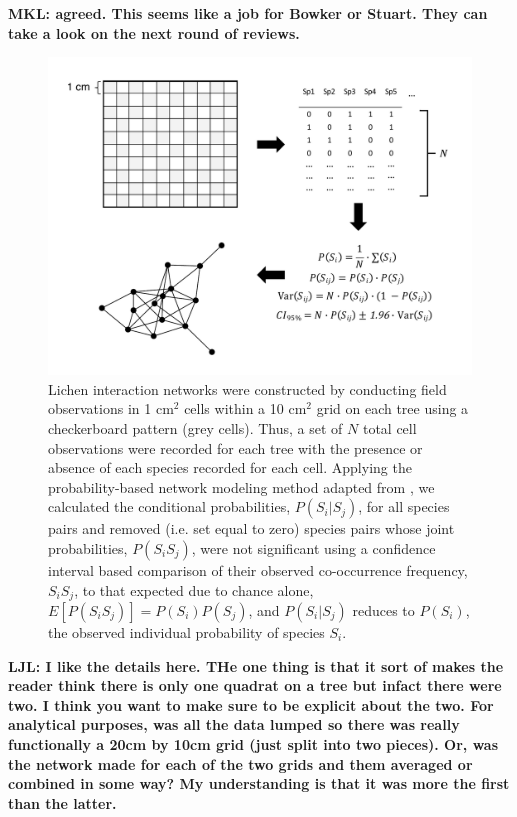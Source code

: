 \documentclass[9pt,twocolumn,twoside,lineno]{pnas-new}
\begin{document}
{\textbf{MKL: agreed. This seems like a job for Bowker or Stuart. They
  can take a look on the next round of reviews.}

\begin{figure}[ht]
\centering
\includegraphics[width=\linewidth]{lcn_araujo_method.pdf}
\caption{Lichen interaction networks were constructed by conducting
  field observations in 1 cm$^2$ cells within a 10 cm$^2$ grid on each
  tree using a checkerboard pattern (grey cells). Thus, a set of $N$
  total cell observations were recorded for each tree with the
  presence or absence of each species recorded for each cell. Applying
  the probability-based network modeling method adapted from
  \cite{Araujo2011}, we calculated the conditional probabilities,
  $P(S_i|S_j)$, for all species pairs and removed (i.e. set equal to
  zero) species pairs whose joint probabilities, $P(S_i S_j)$, were
  not significant using a confidence interval based comparison of
  their observed co-occurrence frequency, $S_iS_j$, to that expected
  due to chance alone, $E[P(S_iS_j)] = P(S_i) P(S_j)$, and
  $P(S_i|S_j)$ reduces to $P(S_i)$, the observed individual
  probability of species $S_i$.}
\label{fig:conet_method}
\end{figure}


\textbf{LJL: I like the details here. THe one thing is that it sort of
  makes the reader think there is only one quadrat on a tree but
  infact there were two. I think you want to make sure to be explicit
  about the two. For analytical purposes, was all the data lumped so
  there was really functionally a 20cm by 10cm grid (just split into
  two pieces). Or, was the network made for each of the two grids and
  them averaged or combined in some way? My understanding is that it
  was more the first than the latter.}

}
\end{document}
